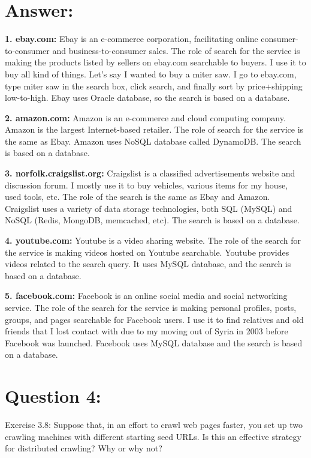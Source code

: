 \documentclass[a4paper, 11pt]{article}
\begin{document}
\section*{Answer:}

\textbf{1. ebay.com:}
Ebay is an e-commerce corporation, facilitating online consumer-to-consumer and business-to-consumer sales. The role of search for the service is making the products listed by sellers on ebay.com searchable to buyers. I use it to buy all kind of things. Let's say I wanted to buy a miter saw. I go to ebay.com, type miter saw in the search box, click search, and finally sort by price+shipping low-to-high. Ebay uses Oracle database, so the search is based on a database.

\textbf{2. amazon.com:}
Amazon is an e-commerce and cloud computing company. Amazon is the largest Internet-based retailer. The role of search for the service is the same as Ebay. Amazon uses NoSQL database called DynamoDB. The search is based on a database.

\textbf{3. norfolk.craigslist.org:}
Craigslist is a classified advertisements website and discussion forum. I mostly use it to buy vehicles, various items for my house, used tools, etc. The role of the search is the same as Ebay and Amazon. Craigslist uses a variety of data storage technologies, both SQL (MySQL) and NoSQL (Redis, MongoDB, memcached, etc). The search is based on a database.

\textbf{4. youtube.com:}
Youtube is a video sharing website. The role of the search for the service is making videos hosted on Youtube searchable. Youtube provides videos related to the search query. It uses MySQL database, and the search is based on a database.

\textbf{5. facebook.com:}
Facebook is an online social media and social networking service. The role of the search for the service is making personal profiles, posts, groups, and pages searchable for Facebook users. I use it to find relatives and old friends that I lost contact with due to my moving out of Syria in 2003 before Facebook was launched. Facebook uses MySQL database and the search is based on a database.


\section*{Question 4:}
Exercise 3.8: Suppose that, in an effort to crawl web pages faster, you set up two crawling
machines with different starting seed URLs. Is this an effective strategy for
distributed crawling? Why or why not?
\end{document}
